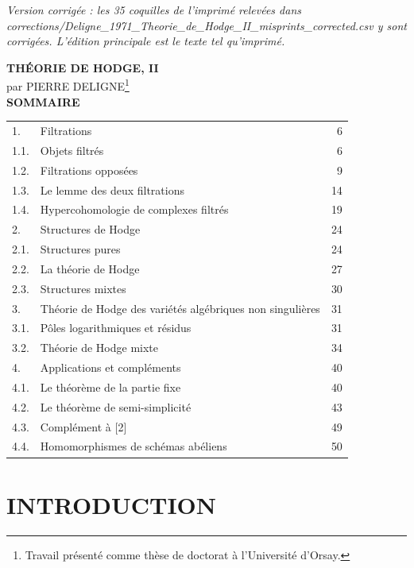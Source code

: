 \documentclass[10pt]{article}
\begin{document}
\begin{center}\small\itshape Version corrigée : les 35 coquilles de l'imprimé relevées dans corrections/Deligne\_1971\_Theorie\_de\_Hodge\_II\_misprints\_corrected.csv y sont corrigées. L'édition principale est le texte tel qu'imprimé.\end{center}


\begin{center}
{\Large\bfseries THÉORIE DE HODGE, II}\\[0.4em]
{\normalsize par PIERRE DELIGNE{\renewcommand{\thefootnote}{(\arabic{footnote})}\footnote{Travail présenté comme thèse de doctorat à l'Université d'Orsay.}}}\\[1.3em]
{\bfseries SOMMAIRE}
\end{center}

\begin{center}
\begin{tabular}{llr}
1. & Filtrations & 6\\
1.1. & Objets filtrés & 6\\
1.2. & Filtrations opposées & 9\\
1.3. & Le lemme des deux filtrations & 14\\
1.4. & Hypercohomologie de complexes filtrés & 19\\
2. & Structures de Hodge & 24\\
2.1. & Structures pures & 24\\
2.2. & La théorie de Hodge & 27\\
2.3. & Structures mixtes & 30\\
3. & Théorie de Hodge des variétés algébriques non singulières & 31\\
3.1. & Pôles logarithmiques et résidus & 31\\
3.2. & Théorie de Hodge mixte & 34\\
4. & Applications et compléments & 40\\
4.1. & Le théorème de la partie fixe & 40\\
4.2. & Le théorème de semi-simplicité & 43\\
4.3. & Complément à [2] & 49\\
4.4. & Homomorphismes de schémas abéliens & 50
\end{tabular}
\end{center}

\section*{INTRODUCTION}
\end{document}
